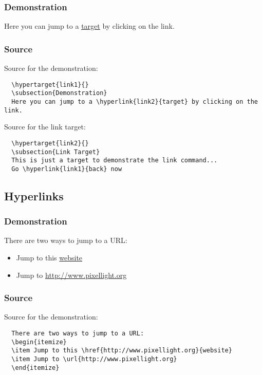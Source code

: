 \hypertarget{link1}{}
\subsubsection{Demonstration}
Here you can jump to a \hyperlink{link2}{target} by clicking on the link.


\subsubsection{Source}
Source for the demonstration:

\begin{verbatim}
  \hypertarget{link1}{}
  \subsection{Demonstration}
  Here you can jump to a \hyperlink{link2}{target} by clicking on the link.
\end{verbatim}

\noindent
Source for the link target:
\begin{verbatim}
  \hypertarget{link2}{}
  \subsection{Link Target}
  This is just a target to demonstrate the link command...
  Go \hyperlink{link1}{back} now
\end{verbatim}
\newpage


\subsection{Hyperlinks}


\subsubsection{Demonstration}
There are two ways to jump to a URL:
\begin{itemize}
\item Jump to this \href{http://www.pixellight.org}{website}
\item Jump to \url{http://www.pixellight.org}
\end{itemize}


\subsubsection{Source}
Source for the demonstration:

\begin{verbatim}
  There are two ways to jump to a URL:
  \begin{itemize}
  \item Jump to this \href{http://www.pixellight.org}{website}
  \item Jump to \url{http://www.pixellight.org}
  \end{itemize}
\end{verbatim}
\newpage

